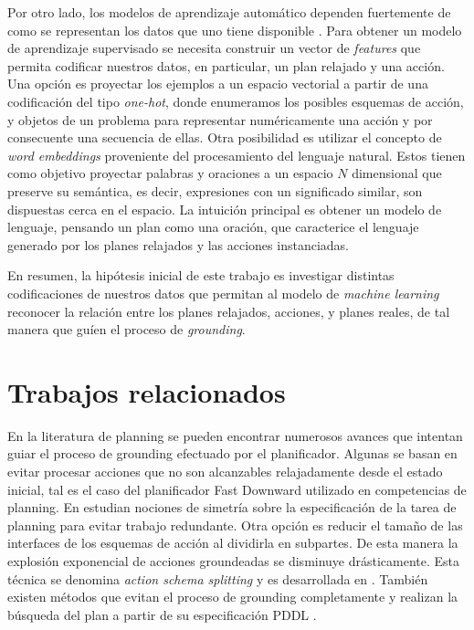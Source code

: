 Por otro lado, los modelos de aprendizaje automático dependen fuertemente de
como se representan los datos que uno tiene disponible \citep{Heaton-2016-AnEA}.
Para obtener un modelo de aprendizaje supervisado se necesita construir un
vector de \emph{features} que permita codificar nuestros datos, en particular,
un plan relajado y una acción. Una opción es proyectar los ejemplos a un espacio
vectorial a partir de una codificación del tipo \emph{one-hot}, donde enumeramos
los posibles esquemas de acción, y objetos de un problema para representar
numéricamente una acción y por consecuente una secuencia de ellas. Otra
posibilidad es utilizar el concepto de \emph{word embeddings} \citep{Mikolov-Ilya-Kai-Greg-Jeffrey-2013,
Pennington-Jeffrey-Socher-Richard-Manning-Christopher-2014,
Bojanowski-Grave-Joulin-Mikolov-2016} proveniente del
procesamiento del lenguaje natural. Estos tienen como objetivo proyectar
palabras y oraciones a un espacio $N$ dimensional que preserve su semántica, es
decir, expresiones con un significado similar, son dispuestas cerca en el
espacio. La intuición principal es obtener un
modelo de lenguaje, pensando un plan como una oración, que caracterice el
lenguaje generado por los planes relajados y las acciones instanciadas. 

En resumen, la hipótesis inicial de este trabajo es investigar distintas
codificaciones de nuestros datos que permitan al modelo de \emph{machine
learning} reconocer la relación entre los planes relajados, acciones, y planes
reales, de tal manera que guíen el proceso de \emph{grounding}.

\section{Trabajos relacionados}

En la literatura de planning se pueden encontrar numerosos avances que intentan
guiar el proceso de grounding efectuado por el planificador. Algunas se
basan en evitar procesar acciones que no son alcanzables relajadamente desde el
estado inicial, tal es el caso del planificador Fast Downward
\citep{Helmert-2011} utilizado en competencias de planning. En
\citep{Röger_Sievers_Katz_2018} estudian nociones de simetría sobre la
especificación de la tarea de planning para evitar trabajo redundante. Otra
opción es reducir el tamaño de las interfaces de los esquemas de acción al
dividirla en subpartes. De esta manera la explosión exponencial de acciones
groundeadas se disminuye drásticamente. Esta técnica se denomina \emph{action
schema splitting} y es desarrollada en
\citep{Areces_Bustos_Dominguez_Hoffmann_2014}. También existen métodos que
evitan el proceso de grounding completamente y realizan la búsqueda del plan a
partir de su especificación PDDL \citep{Penberthy-1992}.

